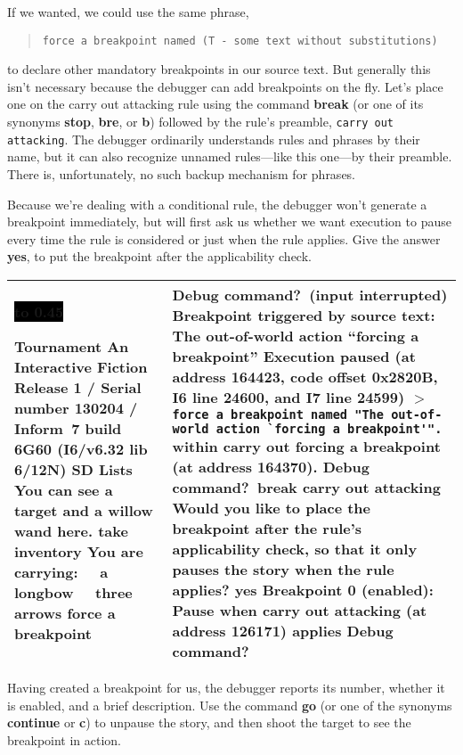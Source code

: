 \documentclass{book}
\newcommand{\n}{\hspace*{\fill}\newline}
\newcommand{\terp}[2]{\begin{center}\begin{tabular}{p{0.45\textwidth}|p{0.45\textwidth}}\midrule #1&#2\\\midrule\end{tabular}\end{center}}
\newcommand{\glkheading}[1]{\textbf{#1}}
\newcommand{\glkinput}[1]{\textbf{#1}}
\newcommand{\glkstatusline}[2]{\centerline{\colorbox{black}{\hbox to 0.45\textwidth{\textcolor{white}{#1\hfil #2}}}}}
\newcommand{\storyprompt}{\raisebox{1.5pt}{\(>\)}}
\newcommand{\cursor}{\raisebox{-1.5pt}{\RectangleThin}}
\newcommand{\markedindent}{\(>\)\qquad}
\begin{document}
If we wanted, we could use the same phrase,

\begin{quote}
  \lstinline{force a breakpoint named (T - some text without substitutions)}
\end{quote}

\noindent to declare other mandatory breakpoints in our source text.  But
generally this isn't necessary because the debugger can add breakpoints on the
fly.  Let's place one on the carry out attacking rule using the command
\glkinput{break} (or one of its synonyms \glkinput{stop}, \glkinput{bre}, or
\glkinput{b}) followed by the rule's preamble, \lstinline{carry out attacking}.
The debugger ordinarily understands rules and phrases by their name, but it can
also recognize unnamed rules---like this one---by their preamble.  There is,
unfortunately, no such backup mechanism for phrases.

Because we're dealing with a conditional rule, the debugger won't generate a
breakpoint immediately, but will first ask us whether we want execution to pause
every time the rule is considered or just when the rule applies.  Give the
answer \glkinput{yes}, to put the breakpoint after the applicability check.

\terp{\glkstatusline{Lists}{0/2}\n
  \glkheading{Tournament}\n
  An Interactive Fiction\n
  Release 1 / Serial number 130204 / Inform~7 build 6G60 (I6/v6.32 lib 6/12N) SD\n
  \n
  \glkheading{Lists}\n
  You can see a target and a willow wand here.\n
  \n
  \storyprompt\glkinput{take inventory}\n
  You are carrying:\n
  \null\ \ a longbow\n
  \null\ \ three arrows\n
  \n
  \storyprompt\glkinput{force a breakpoint}}{%
  Debug command?\ (input interrupted)\n
  \glkheading{Breakpoint triggered by source text:} The out-of-world action ``forcing a breakpoint''\n
  \n
  Execution paused (at address 164423, code offset 0x2820B, I6 line 24600, and I7 line 24599)\n
  \markedindent \lstinline{force a breakpoint named "The out-of-world action `forcing a breakpoint'".}\n
  within carry out forcing a breakpoint (at address 164370).\n
  \n
  Debug command?\ \glkinput{break carry out attacking}\n
  \n
  Would you like to place the breakpoint after the rule's applicability check, so that it only pauses the story when the rule applies? \glkinput{yes}\n
  \n
  Breakpoint 0 (enabled): Pause when carry out attacking (at address 126171) applies\n
  \n
  Debug command?\ \cursor}

Having created a breakpoint for us, the debugger reports its number, whether it
is enabled, and a brief description.  Use the command \glkinput{go} (or one of
the synonyms \glkinput{continue} or \glkinput{c}) to unpause the story, and then
shoot the target to see the breakpoint in action.
\end{document}
